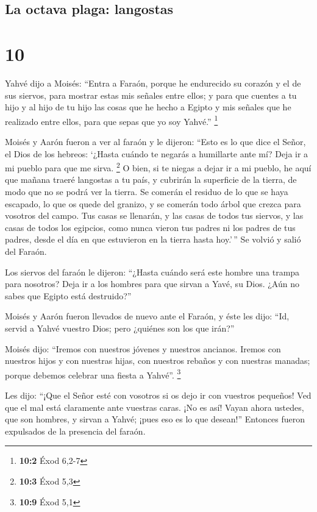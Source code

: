 \hypertarget{la-octava-plaga-langostas}{%
\subsection{La octava plaga:
langostas}\label{la-octava-plaga-langostas}}

\hypertarget{section-9}{%
\section{10}\label{section-9}}

 Yahvé dijo a Moisés: ``Entra a Faraón, porque he
endurecido su corazón y el de sus siervos, para mostrar estas mis
señales entre ellos;  y para que cuentes a tu hijo y al
hijo de tu hijo las cosas que he hecho a Egipto y mis señales que he
realizado entre ellos, para que sepas que yo soy Yahvé.'' \footnote{\textbf{10:2}
  Éxod 6,2-7}

 Moisés y Aarón fueron a ver al faraón y le dijeron:
``Esto es lo que dice el Señor, el Dios de los hebreos: `¿Hasta cuándo
te negarás a humillarte ante mí? Deja ir a mi pueblo para que me sirva.
\footnote{\textbf{10:3} Éxod 5,3}  O bien, si te niegas a
dejar ir a mi pueblo, he aquí que mañana traeré langostas a tu país,
 y cubrirán la superficie de la tierra, de modo que no se
podrá ver la tierra. Se comerán el residuo de lo que se haya escapado,
lo que os quede del granizo, y se comerán todo árbol que crezca para
vosotros del campo.  Tus casas se llenarán, y las casas de
todos tus siervos, y las casas de todos los egipcios, como nunca vieron
tus padres ni los padres de tus padres, desde el día en que estuvieron
en la tierra hasta hoy.'\,'' Se volvió y salió del Faraón.

 Los siervos del faraón le dijeron: ``¿Hasta cuándo será
este hombre una trampa para nosotros? Deja ir a los hombres para que
sirvan a Yavé, su Dios. ¿Aún no sabes que Egipto está destruido?''

 Moisés y Aarón fueron llevados de nuevo ante el Faraón, y
éste les dijo: ``Id, servid a Yahvé vuestro Dios; pero ¿quiénes son los
que irán?''

 Moisés dijo: ``Iremos con nuestros jóvenes y nuestros
ancianos. Iremos con nuestros hijos y con nuestras hijas, con nuestros
rebaños y con nuestras manadas; porque debemos celebrar una fiesta a
Yahvé''. \footnote{\textbf{10:9} Éxod 5,1}

 Les dijo: ``¡Que el Señor esté con vosotros si os dejo
ir con vuestros pequeños! Ved que el mal está claramente ante vuestras
caras.  ¡No es así! Vayan ahora ustedes, que son hombres,
y sirvan a Yahvé; ¡pues eso es lo que desean!'' Entonces fueron
expulsados de la presencia del faraón.

